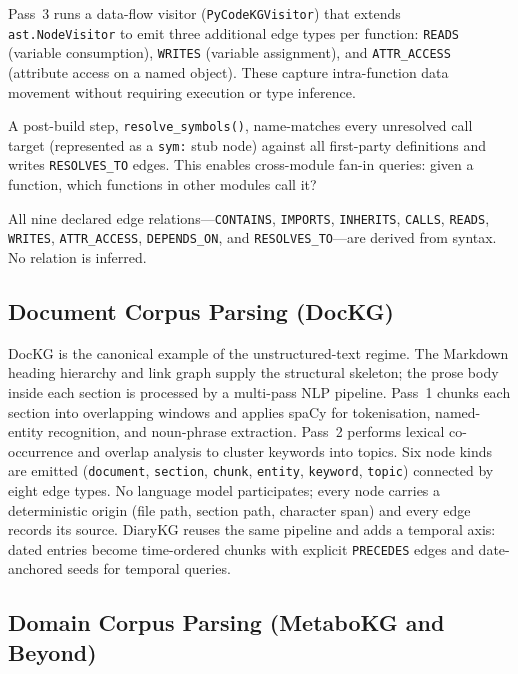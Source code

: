 \documentclass[10pt]{article}
\begin{document}
Pass~3 runs a data-flow visitor (\texttt{PyCodeKGVisitor}) that extends
\texttt{ast.NodeVisitor} to emit three additional edge types per function:
\texttt{READS} (variable consumption), \texttt{WRITES} (variable assignment),
and \texttt{ATTR\_ACCESS} (attribute access on a named object). These capture
intra-function data movement without requiring execution or type inference.

A post-build step, \texttt{resolve\_symbols()}, name-matches every unresolved
call target (represented as a \texttt{sym:} stub node) against all first-party
definitions and writes \texttt{RESOLVES\_TO} edges. This enables cross-module
fan-in queries: given a function, which functions in other modules call it?

All nine declared edge relations---\texttt{CONTAINS}, \texttt{IMPORTS},
\texttt{INHERITS}, \texttt{CALLS}, \texttt{READS}, \texttt{WRITES},
\texttt{ATTR\_ACCESS}, \texttt{DEPENDS\_ON}, and \texttt{RESOLVES\_TO}---are
derived from syntax. No relation is inferred.

\subsection{Document Corpus Parsing (DocKG)}

DocKG is the canonical example of the unstructured-text regime. The Markdown
heading hierarchy and link graph supply the structural skeleton; the prose
body inside each section is processed by a multi-pass NLP pipeline. Pass~1
chunks each section into overlapping windows and applies spaCy for
tokenisation, named-entity recognition, and noun-phrase extraction. Pass~2
performs lexical co-occurrence and overlap analysis to cluster keywords into
topics. Six node kinds are emitted (\texttt{document}, \texttt{section},
\texttt{chunk}, \texttt{entity}, \texttt{keyword}, \texttt{topic}) connected
by eight edge types. No language model participates; every node carries a
deterministic origin (file path, section path, character span) and every edge
records its source. DiaryKG reuses the same pipeline and adds a temporal
axis: dated entries become time-ordered chunks with explicit \texttt{PRECEDES}
edges and date-anchored seeds for temporal queries.

\subsection{Domain Corpus Parsing (MetaboKG and Beyond)}
\end{document}

